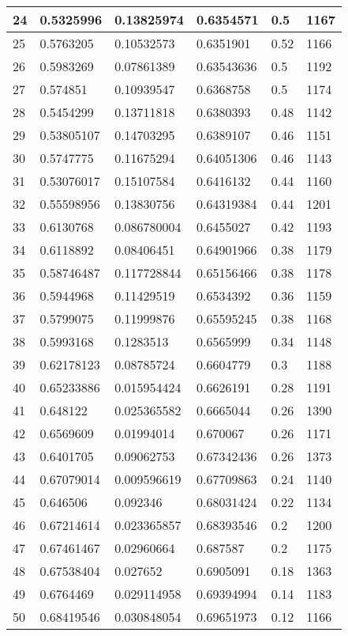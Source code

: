 \begin{longtable}{|l|l|l|l|l|l|}
24 & 0.5325996 & 0.13825974 & 0.6354571 & 0.5 & 1167 \\ \hline 
25 & 0.5763205 & 0.10532573 & 0.6351901 & 0.52 & 1166 \\ \hline 
26 & 0.5983269 & 0.07861389 & 0.63543636 & 0.5 & 1192 \\ \hline 
27 & 0.574851 & 0.10939547 & 0.6368758 & 0.5 & 1174 \\ \hline 
28 & 0.5454299 & 0.13711818 & 0.6380393 & 0.48 & 1142 \\ \hline 
29 & 0.53805107 & 0.14703295 & 0.6389107 & 0.46 & 1151 \\ \hline 
30 & 0.5747775 & 0.11675294 & 0.64051306 & 0.46 & 1143 \\ \hline 
31 & 0.53076017 & 0.15107584 & 0.6416132 & 0.44 & 1160 \\ \hline 
32 & 0.55598956 & 0.13830756 & 0.64319384 & 0.44 & 1201 \\ \hline 
33 & 0.6130768 & 0.086780004 & 0.6455027 & 0.42 & 1193 \\ \hline 
34 & 0.6118892 & 0.08406451 & 0.64901966 & 0.38 & 1179 \\ \hline 
35 & 0.58746487 & 0.117728844 & 0.65156466 & 0.38 & 1178 \\ \hline 
36 & 0.5944968 & 0.11429519 & 0.6534392 & 0.36 & 1159 \\ \hline 
37 & 0.5799075 & 0.11999876 & 0.65595245 & 0.38 & 1168 \\ \hline 
38 & 0.5993168 & 0.1283513 & 0.6565999 & 0.34 & 1148 \\ \hline 
39 & 0.62178123 & 0.08785724 & 0.6604779 & 0.3 & 1188 \\ \hline 
40 & 0.65233886 & 0.015954424 & 0.6626191 & 0.28 & 1191 \\ \hline 
41 & 0.648122 & 0.025365582 & 0.6665044 & 0.26 & 1390 \\ \hline 
42 & 0.6569609 & 0.01994014 & 0.670067 & 0.26 & 1171 \\ \hline 
43 & 0.6401705 & 0.09062753 & 0.67342436 & 0.26 & 1373 \\ \hline 
44 & 0.67079014 & 0.009596619 & 0.67709863 & 0.24 & 1140 \\ \hline 
45 & 0.646506 & 0.092346 & 0.68031424 & 0.22 & 1134 \\ \hline 
46 & 0.67214614 & 0.023365857 & 0.68393546 & 0.2 & 1200 \\ \hline 
47 & 0.67461467 & 0.02960664 & 0.687587 & 0.2 & 1175 \\ \hline 
48 & 0.67538404 & 0.027652 & 0.6905091 & 0.18 & 1363 \\ \hline 
49 & 0.6764469 & 0.029114958 & 0.69394994 & 0.14 & 1183 \\ \hline 
50 & 0.68419546 & 0.030848054 & 0.69651973 & 0.12 & 1166 \\ \hline 
\end{longtable}